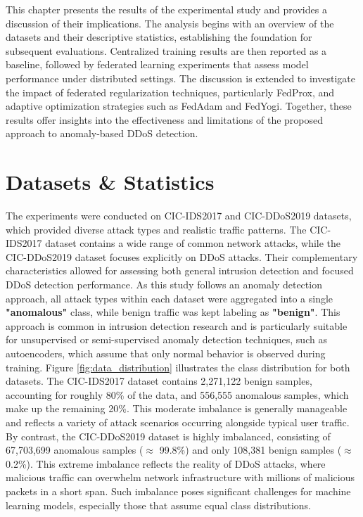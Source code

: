 This chapter presents the results of the experimental study and provides a discussion of their implications. The analysis begins with an overview of the datasets and their descriptive statistics, establishing the foundation for subsequent evaluations. Centralized training results are then reported as a baseline, followed by federated learning experiments that assess model performance under distributed settings. The discussion is extended to investigate the impact of federated regularization techniques, particularly FedProx, and adaptive optimization strategies such as FedAdam and FedYogi. Together, these results offer insights into the effectiveness and limitations of the proposed approach to anomaly-based DDoS detection.

\section{Datasets \& Statistics}

The experiments were conducted on CIC-IDS2017 and CIC-DDoS2019 datasets, which provided diverse attack types and realistic traffic patterns. The CIC-IDS2017 dataset contains a wide range of common network attacks, while the CIC-DDoS2019 dataset focuses explicitly on DDoS attacks. Their complementary characteristics allowed for assessing both general intrusion detection and focused DDoS detection performance. As this study follows an anomaly detection approach, all attack types within each dataset were aggregated into a single \textbf{"anomalous" } class, while benign traffic was kept labeling as \textbf{"benign"}. This approach is common in intrusion detection research and is particularly suitable for unsupervised or semi-supervised anomaly detection techniques, such as autoencoders, which assume that only normal behavior is observed during training. Figure \ref{fig:data_distribution} illustrates the class distribution for both datasets. The CIC-IDS2017 dataset contains 2,271,122 benign samples, accounting for roughly 80\% of the data, and 556,555 anomalous samples, which make up the remaining 20\%. This moderate imbalance is generally manageable and reflects a variety of attack scenarios occurring alongside typical user traffic. By contrast, the CIC-DDoS2019 dataset is highly imbalanced, consisting of 67,703,699 anomalous samples ($\approx$ 99.8\%) and only 108,381 benign samples ($\approx$ 0.2\%). This extreme imbalance reflects the reality of DDoS attacks, where malicious traffic can overwhelm network infrastructure with millions of malicious packets in a short span. Such imbalance poses significant challenges for machine learning models, especially those that assume equal class distributions.

